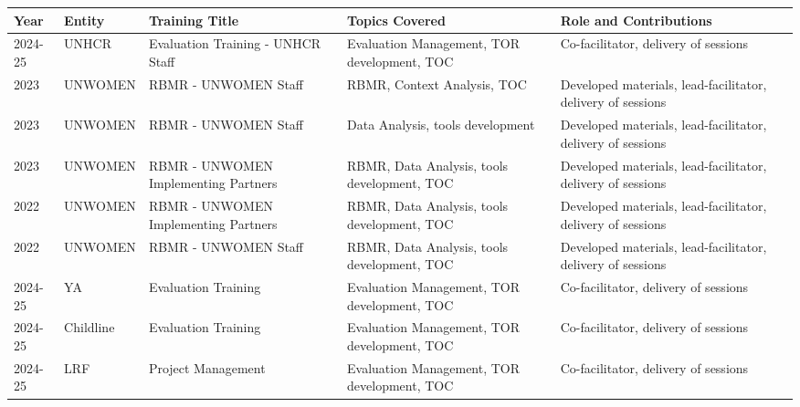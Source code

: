 \documentclass[
  10pt,
]{article}
\begin{document}
\begin{landscape}
\begin{tabularx}{\linewidth}{|l|l|l|X|X|}
\hline
\textbf{Year} & \textbf{Entity} & \textbf{Training Title} & \textbf{Topics Covered} & \textbf{Role and Contributions} \\ 
\hline
2024-25 & UNHCR & Evaluation Training - UNHCR Staff & Evaluation Management, TOR development, TOC & Co-facilitator, delivery of sessions \\ 
\hline
2023 & UNWOMEN & RBMR - UNWOMEN Staff & RBMR, Context Analysis, TOC & Developed materials, lead-facilitator, delivery of sessions \\ 
\hline
2023 & UNWOMEN & RBMR - UNWOMEN Staff & Data Analysis, tools development & Developed materials, lead-facilitator, delivery of sessions \\ 
\hline
2023 & UNWOMEN & RBMR - UNWOMEN Implementing Partners & RBMR, Data Analysis, tools development, TOC & Developed materials, lead-facilitator, delivery of sessions \\ 
\hline
2022 & UNWOMEN & RBMR - UNWOMEN Implementing Partners & RBMR, Data Analysis, tools development, TOC & Developed materials, lead-facilitator, delivery of sessions \\ 
\hline
2022 & UNWOMEN & RBMR - UNWOMEN Staff & RBMR, Data Analysis, tools development, TOC & Developed materials, lead-facilitator, delivery of sessions \\ 
\hline
2024-25 & YA & Evaluation Training & Evaluation Management, TOR development, TOC & Co-facilitator, delivery of sessions \\ 
\hline
2024-25 & Childline & Evaluation Training & Evaluation Management, TOR development, TOC & Co-facilitator, delivery of sessions \\ 
\hline
2024-25 & LRF & Project Management & Evaluation Management, TOR development, TOC & Co-facilitator, delivery of sessions \\ 
\hline
\end{tabularx}

\end{landscape}
\end{document}
